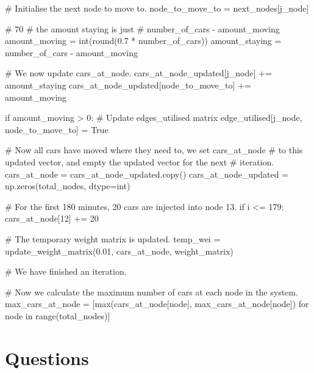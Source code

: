 \documentclass[paper=a4, fontsize=12pt]{scrartcl} %
\numberwithin{equation}{section}       %
\numberwithin{figure}{section}         %
\numberwithin{table}{section}          %
\begin{document}
\begin{python}
                # Initialise the next node to move to.
                node_to_move_to = next_nodes[j_node]

                # 70%
                # the amount staying is just 
                # number_of_cars - amount_moving
                amount_moving = int(round(0.7 * number_of_cars))
                amount_staying = number_of_cars - amount_moving

                # We now update cars_at_node.
                cars_at_node_updated[j_node] += amount_staying
                cars_at_node_updated[node_to_move_to] += amount_moving

                if amount_moving > 0:
                    # Update edges_utilised matrix
                    edge_utilised[j_node, node_to_move_to] = True

        # Now all cars have moved where they need to, we set cars_at_node
        # to this updated vector, and empty the updated vector for the next
        # iteration.
        cars_at_node = cars_at_node_updated.copy()
        cars_at_node_updated = np.zeros(total_nodes, dtype=int)

        # For the first 180 minutes, 20 cars are injected into node 13.
        if i <= 179:
            cars_at_node[12] += 20

        # The temporary weight matrix is updated.
        temp_wei = update_weight_matrix(0.01, cars_at_node, weight_matrix)

        # We have finished an iteration.

       # Now we calculate the maximum number of cars at each node in the system.
        max_cars_at_node = [max(cars_at_node[node], max_cars_at_node[node]) 
                            for node in range(total_nodes)]
\end{python}

\section{Questions}
\end{document}

